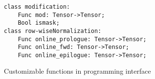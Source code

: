 



\begin{figure}
    \begin{lstlisting}
class modification:
    Func mod: Tensor->Tensor;
    Bool ismask;
class row-wiseNormalization:
    Func online_prologue: Tensor->Tensor;
    Func online_fwd: Tensor->Tensor;
    Func online_epilogue: Tensor->Tensor;
    \end{lstlisting}
  \vspace{-3mm}
    \caption{Customizable functions in programming interface}
  \vspace{-5mm}
    \label{fig:interface-pseudocode}
\end{figure}

